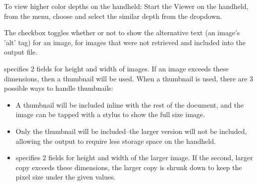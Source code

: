 \begin{basictip}
To view higher color depths on the handheld: Start the Viewer on
the handheld, from the menu, choose  and 
select the similar depth from the  dropdown.
\end{basictip}


The 
checkbox toggles whether or not to show the alternative text 
(an image's 'alt' tag) for an image, for images that were not retrieved and 
included into the output file. \notimplemented

 specifies 2 fields for height and width of images. If an image 
exceeds these dimensions, then a thumbnail will be used. When a thumbnail is 
used, there are 3 possible ways to handle thumbnails:

\begin{itemize}
  \item {} 
  A thumbnail will be included inline with the rest of the document, and the 
  image can be tapped with a stylus to show the full size image. 

  \item {} Only the thumbnail will be included--the 
  larger version will not be included, allowing the output to require less 
  storage space on the handheld.

  \item {} specifies 2 fields for height and 
  width of the larger image. If the second, larger copy exceeds these dimensions, 
  the larger copy is shrunk down to keep the pixel size under the given values.
\end{itemize}

